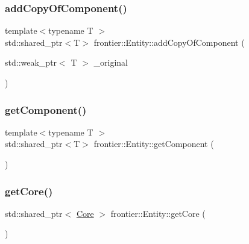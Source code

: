 \subsubsection{\texorpdfstring{add\+Copy\+Of\+Component()}{addCopyOfComponent()}}
{\footnotesize\ttfamily template$<$typename T $>$ \\
std\+::shared\+\_\+ptr$<$T$>$ frontier\+::\+Entity\+::add\+Copy\+Of\+Component (\begin{DoxyParamCaption}\item[{std\+::weak\+\_\+ptr$<$ T $>$}]{\+\_\+original }\end{DoxyParamCaption})\hspace{0.3cm}{\ttfamily [inline]}}

\mbox{\label{classfrontier_1_1_entity_a7657bce9cd7f405f69e59c61a69adf86}} 
\subsubsection{\texorpdfstring{get\+Component()}{getComponent()}}
{\footnotesize\ttfamily template$<$typename T $>$ \\
std\+::shared\+\_\+ptr$<$T$>$ frontier\+::\+Entity\+::get\+Component (\begin{DoxyParamCaption}{ }\end{DoxyParamCaption})\hspace{0.3cm}{\ttfamily [inline]}}

\mbox{\label{classfrontier_1_1_entity_a16f971a959ad628436e92368c342e2a2}} 
\subsubsection{\texorpdfstring{get\+Core()}{getCore()}}
{\footnotesize\ttfamily std\+::shared\+\_\+ptr$<$ \hyperlink{classfrontier_1_1_core}{Core} $>$ frontier\+::\+Entity\+::get\+Core (\begin{DoxyParamCaption}{ }\end{DoxyParamCaption})}

\mbox{\label{classfrontier_1_1_entity_a52e5f9cb6d6f8fddef34f58b7cc5daa8}} 

